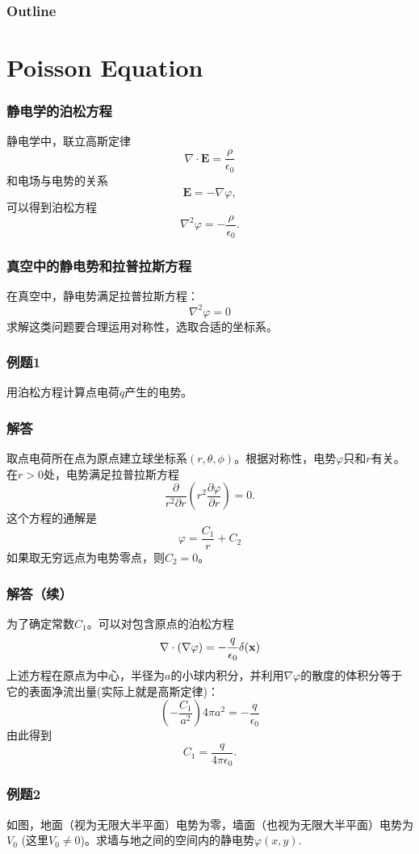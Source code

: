 \documentclass[CJK]{beamer}
\date{}
\begin{document}
\bch


\begin{frame}
\frametitle{Outline}
\tableofcontents
\end{frame}

\section{Poisson Equation}


\begin{frame}
  \frametitle{静电学的泊松方程}
  静电学中，联立高斯定律
  $$\nabla\cdot \mathbf{E}= \frac{\rho}{\epsilon_0} $$
  和电场与电势的关系 
  $$\mathbf{E} = -\nabla \varphi,$$
  可以得到泊松方程
  $$\nabla^2\varphi = -\frac{\rho}{\epsilon_0}. $$
\end{frame}

\begin{frame}
  \frametitle{真空中的静电势和拉普拉斯方程}
  在真空中，静电势满足拉普拉斯方程：
  $$\nabla^2\varphi =0$$
  求解这类问题要合理运用对称性，选取合适的坐标系。
\end{frame}



\begin{frame}
  \frametitle{例题1}
  用泊松方程计算点电荷$q$产生的电势。
\end{frame}


\begin{frame}
  \frametitle{解答}
  取点电荷所在点为原点建立球坐标系$(r,\theta,\phi)$。根据对称性，电势$\varphi$只和$r$有关。
  在$r>0$处，电势满足拉普拉斯方程
  $$\frac{\partial }{r^2\partial r}\left(r^2 \frac{\partial \varphi}{\partial r}\right) = 0.$$
  这个方程的通解是
  $$\varphi = \frac{C_1}{r}+C_2$$
  如果取无穷远点为电势零点，则$C_2=0$。
\end{frame}


\begin{frame}
  \frametitle{解答（续）}
  为了确定常数$C_1$。可以对包含原点的泊松方程
  $$\nabla\cdot(\nabla\varphi) = -\frac{q}{\epsilon_0}\delta({\mathbf{x}})$$
  上述方程在原点为中心，半径为$a$的小球内积分，并利用$\nabla \varphi$的散度的体积分等于它的表面净流出量(实际上就是高斯定律)：
  $$ (-\frac{C_1}{a^2})4\pi a^2 = -\frac{q}{\epsilon_0}$$
  由此得到$$C_1=\frac{q}{4\pi\epsilon_0}.$$
\end{frame}


\begin{frame}
  \frametitle{例题2}

  如图，地面（视为无限大半平面）电势为零，墙面（也视为无限大半平面）电势为$V_0$ (这里$V_0\ne 0$)。求墙与地之间的空间内的静电势$\varphi(x,y)$.

\end{frame}
\end{document}
